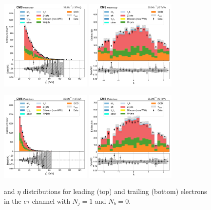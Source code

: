 \begin{figure}[htb!]
    \centering
    \includegraphics[width=0.4\textwidth]{chapters/Appendix/sectionPlots/figures/data_mc_overlays/etau_2016_cat_eq1_eq0_signal_linear_lepton_lepton1_pt}
    \includegraphics[width=0.4\textwidth]{chapters/Appendix/sectionPlots/figures/data_mc_overlays/etau_2016_cat_eq1_eq0_signal_linear_lepton_lepton1_eta}

    \includegraphics[width=0.4\textwidth]{chapters/Appendix/sectionPlots/figures/data_mc_overlays/etau_2016_cat_eq1_eq0_signal_linear_lepton_lepton2_pt}
    \includegraphics[width=0.4\textwidth]{chapters/Appendix/sectionPlots/figures/data_mc_overlays/etau_2016_cat_eq1_eq0_signal_linear_lepton_lepton2_eta}
    \caption{\pt and $\eta$ distributions for leading (top) and trailing
        (bottom) electrons in the $e\tau$ channel with $N_{j} = 1$ and
        $N_{b} = 0$.}
    \label{fig:etau_2_kinematic}
\end{figure}

